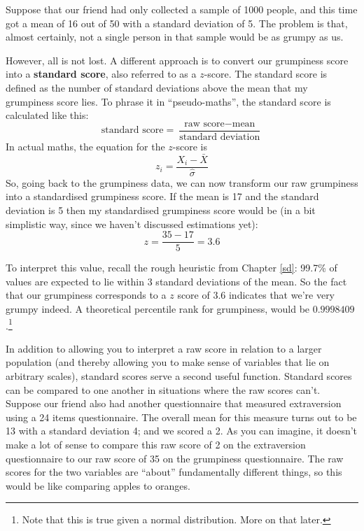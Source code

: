 \documentclass[
  11pt,
  a4paper,
  twoside,symmetric,openright]{book}
\theoremstyle{break}
\theoremstyle{break}
\begin{document}
Suppose that our friend had only collected a sample of 1000 people, and this time got a mean of 16 out of 50 with a standard deviation of 5. The problem is that, almost certainly, not a single person in that sample would be as grumpy as us.

However, all is not lost. A different approach is to convert our grumpiness score into a \textbf{standard score}, also referred to as a \(z\)-score. The standard score is defined as the number of standard deviations above the mean that my grumpiness score lies. To phrase it in ``pseudo-maths'', the standard score is calculated like this:
\[
\mbox{standard score} = \frac{\mbox{raw score} - \mbox{mean}}{\mbox{standard deviation}}
\]
In actual maths, the equation for the \(z\)-score is
\[
z_i = \frac{X_i - \bar{X}}{\hat\sigma}
\]
So, going back to the grumpiness data, we can now transform our raw grumpiness into a standardised grumpiness score. If the mean is 17 and the standard deviation is 5 then my standardised grumpiness score would be (in a bit simplistic way, since we haven't discussed estimations yet):
\[
z = \frac{35 - 17}{5} = 3.6
\]

To interpret this value, recall the rough heuristic from Chapter \ref{sd}: 99.7\% of values are expected to lie within 3 standard deviations of the mean. So the fact that our grumpiness corresponds to a \(z\) score of 3.6 indicates that we're very grumpy indeed. A theoretical percentile rank for grumpiness, would be \(0.9998409\).\footnote{Note that this is true given a normal distribution. More on that later.}

In addition to allowing you to interpret a raw score in relation to a larger population (and thereby allowing you to make sense of variables that lie on arbitrary scales), standard scores serve a second useful function. Standard scores can be compared to one another in situations where the raw scores can't. Suppose our friend also had another questionnaire that measured extraversion using a 24 items questionnaire. The overall mean for this measure turns out to be 13 with a standard deviation 4; and we scored a 2. As you can imagine, it doesn't make a lot of sense to compare this raw score of 2 on the extraversion questionnaire to our raw score of 35 on the grumpiness questionnaire. The raw scores for the two variables are ``about'' fundamentally different things, so this would be like comparing apples to oranges.
\end{document}
